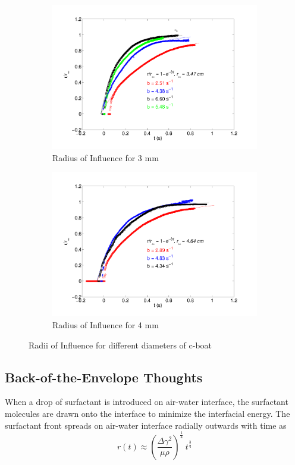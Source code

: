 \documentclass[12pt]{article}
\begin{document}
\begin{figure}[h]
\begin{subfigure}[h]{0.5\textwidth}
       \includegraphics[scale=0.3]{roi_3mm_250mm.pdf}
       \caption{Radius of Influence for 3 mm}
       \label{fig:roi3mm}
	\end{subfigure}
	\hfill
	\begin{subfigure}[h]{0.5\textwidth}
    \centering
       \includegraphics[scale=0.3]{roi_4mm_250mm.pdf}
       \caption{Radius of Influence for 4 mm}
       \label{fig:roi4mm}
	\end{subfigure}
	\caption{Radii of Influence for different diameters of c-boat}
	\label{fig:roiAll}
\end{figure}

\subsection{Back-of-the-Envelope Thoughts}
When a drop of surfactant is introduced on air-water interface, the surfactant molecules are drawn onto the interface to minimize the interfacial energy. The surfactant front spreads on air-water interface radially outwards with time as 
\begin{equation}\label{eq:rnosub}
r(t) \approx \left(\frac{\Delta \gamma^{2}}{\mu \rho}\right)^{\frac{1}{4}}\ t^{\frac{3}{4}}
\end{equation}
\end{document}
